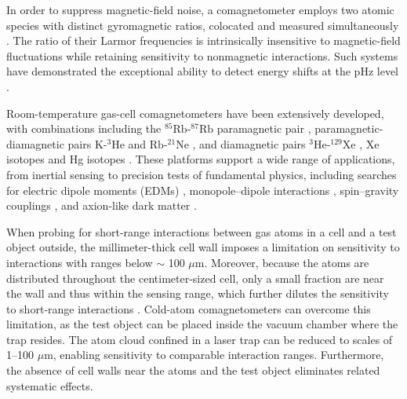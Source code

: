 \documentclass[pdflatex,sn-nature,centre]{sn-jnl}%
\begin{document}
In order to suppress magnetic-field noise, a comagnetometer employs two atomic species with distinct gyromagnetic ratios, colocated and measured simultaneously \cite{Terrano2022ComagNewPhys}. The ratio of their Larmor frequencies is intrinsically insensitive to magnetic-field fluctuations while retaining sensitivity to nonmagnetic interactions. Such systems have demonstrated the exceptional ability to detect energy shifts at the pHz level \cite{Vasilakis2009ComagSpinDependent}.

Room-temperature gas-cell comagnetometers have been extensively developed, with combinations including the $^{85}\mathrm{Rb}$-$^{87}\mathrm{Rb}$ paramagnetic pair \cite{Kimball2013ComagSpinGravity}, paramagnetic-diamagnetic pairs $\mathrm K$-$^3\mathrm{He}$ \cite{Vasilakis2009ComagSpinDependent} and $\mathrm {Rb}$-$^{21}\mathrm{Ne}$ \cite{Almasi2020ComagSpinSpin}, and diamagnetic pairs $^3\mathrm{He}$-$^{129}\mathrm{Xe}$ \cite{Cane2004ComagLorentz&CPT, Allmendinger2014ComagLorentz&CPT, Almasi2020ComagSpinSpin}, 
Xe isotopes \cite{Bulatowicz2013ComagAxionlike, Feng2022XeComagM-N} and Hg isotopes \cite{Lamoreaux1986ComagLorentz}. These platforms support a wide range of applications, from inertial sensing \cite{Kornack2005ComagGyroscope} to precision tests of fundamental physics, including searches for electric dipole moments (EDMs) \cite{Rosenberry2001ComagEDM, Sachdeva2019ComagEDM, Abel2020ComagnEDM}, monopole–dipole interactions \cite{Bulatowicz2013ComagAxionlike, Tullney2013SpinDependent, Feng2022XeComagM-N}, spin–gravity couplings \cite{Venema1992HgComagSpinGravity, Vasilakis2009ComagSpinDependent, Kimball2013ComagSpinGravity, Zhang2023ComagSpinGravity}, and axion-like dark matter \cite{Wu2019ComagDarkMatter, Alonso2019ComagDarkMatter}. 

When probing for short-range interactions between gas atoms in a cell and a test object outside, the millimeter-thick cell wall imposes a limitation on sensitivity to interactions with ranges below $\sim$ 100 $\mu$m. Moreover, because the atoms are distributed throughout the centimeter-sized cell, only a small fraction are near the wall and thus within the sensing range, which further dilutes the sensitivity to short‑range interactions \cite{Feng2022XeComagM-N}. Cold-atom comagnetometers can overcome this limitation, as the test object can be placed inside the vacuum chamber where the trap resides. The atom cloud confined in a laser trap can be reduced to scales of 1–100 $\mu$m, enabling sensitivity to comparable interaction ranges. Furthermore, the absence of cell walls near the atoms and the test object eliminates related systematic effects.
\end{document}
